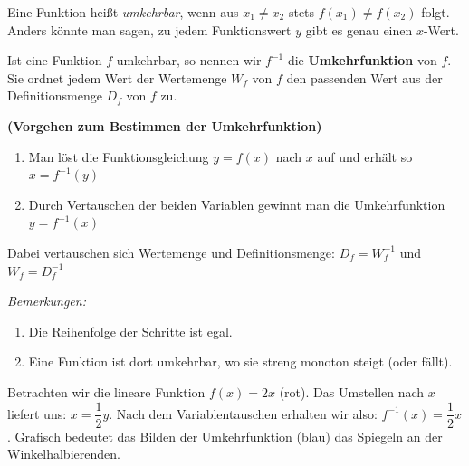 \documentclass[ngerman, 12pt]{nssheetxea}
\begin{document}
\begin{definition}
Eine Funktion heißt \textit{umkehrbar}, wenn aus $x_1 \neq x_2$ stets $f(x_1) \neq f(x_2)$ folgt. Anders könnte man sagen, zu jedem Funktionswert $y$ gibt es genau einen $x$-Wert. \par
Ist eine Funktion $f$ umkehrbar, so nennen wir $f^{-1}$ die \textbf{Umkehrfunktion} von $f$. Sie ordnet jedem Wert der Wertemenge $W_f$ von $f$ den passenden Wert aus der Definitionsmenge $D_f$ von $f$ zu.
 
\end{definition}

\begin{theorem}
\textbf{(Vorgehen zum Bestimmen der Umkehrfunktion)}
\begin{enumerate}
\item Man löst die Funktionsgleichung $y=f(x)$ nach $x$ auf und erhält so $x=f^{-1}(y)$
\item Durch Vertauschen der beiden Variablen gewinnt man die Umkehrfunktion $y=f^{-1}(x)$
\end{enumerate}
Dabei vertauschen sich Wertemenge und Definitionsmenge: $D_f=W_f^{-1}$ und $W_f=D_f^{-1}$ \par
\textit{Bemerkungen:}
\begin{enumerate}[(1)]
\item Die Reihenfolge der Schritte ist egal.
\item Eine Funktion ist dort umkehrbar, wo sie streng monoton steigt (oder fällt).
\end{enumerate}
\end{theorem}

\begin{example}
Betrachten wir die lineare Funktion $f(x)=2x$ (rot). Das Umstellen nach $x$ liefert uns: $x=\dfrac{1}{2}y$. Nach dem Variablentauschen erhalten wir also: $f^{-1}(x)=\dfrac{1}{2}x$. Grafisch bedeutet das Bilden der Umkehrfunktion (blau) das Spiegeln an der Winkelhalbierenden.


\begin{center}
\end{center}
\end{example}
\end{document}
